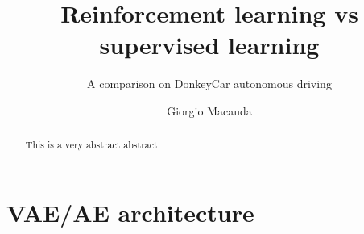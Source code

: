 \documentclass[mscthesis]{usiinfthesis}
\title{Reinforcement learning vs supervised learning} %
\subtitle{A comparison on DonkeyCar autonomous driving} %
\author{Giorgio Macauda} %
\begin{document}
\maketitle %

\frontmatter %

\begin{abstract}
This is a very abstract abstract. 

\end{abstract}
\begin{acknowledgements}

\end{acknowledgements}


\tableofcontents 
\listoffigures %
\listoftables %

\mainmatter









\appendix %

\chapter{VAE/AE architecture} \label{app:ae/vae}
\begin{center}
    \begin{minipage}{0.9\linewidth}
      
      \end{minipage}
\end{center}
\begin{center}
    \begin{minipage}{0.9\linewidth}
      
      \end{minipage}
\end{center}

\backmatter


%
%



\end{document}
